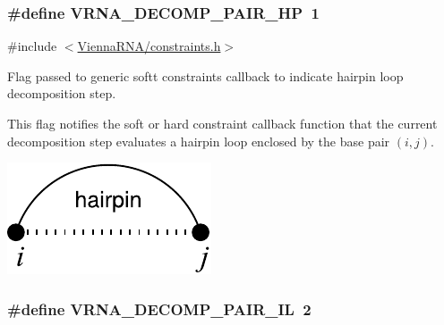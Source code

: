 \subsubsection[{\texorpdfstring{V\+R\+N\+A\+\_\+\+D\+E\+C\+O\+M\+P\+\_\+\+P\+A\+I\+R\+\_\+\+HP}{VRNA_DECOMP_PAIR_HP}}]{\setlength{\rightskip}{0pt plus 5cm}\#define V\+R\+N\+A\+\_\+\+D\+E\+C\+O\+M\+P\+\_\+\+P\+A\+I\+R\+\_\+\+HP~1}\hypertarget{group__constraints_ga8bd41ebc8039378d242e4e8c273716a5}{}\label{group__constraints_ga8bd41ebc8039378d242e4e8c273716a5}


{\ttfamily \#include $<$\hyperlink{constraints_8h}{Vienna\+R\+N\+A/constraints.\+h}$>$}



Flag passed to generic softt constraints callback to indicate hairpin loop decomposition step. 

This flag notifies the soft or hard constraint callback function that the current decomposition step evaluates a hairpin loop enclosed by the base pair $(i,j)$.

 
\begin{DoxyImageNoCaption}
  \mbox{\includegraphics[width=\textwidth,height=\textheight/2,keepaspectratio=true]{decomp_hp}}
\end{DoxyImageNoCaption}
\subsubsection[{\texorpdfstring{V\+R\+N\+A\+\_\+\+D\+E\+C\+O\+M\+P\+\_\+\+P\+A\+I\+R\+\_\+\+IL}{VRNA_DECOMP_PAIR_IL}}]{\setlength{\rightskip}{0pt plus 5cm}\#define V\+R\+N\+A\+\_\+\+D\+E\+C\+O\+M\+P\+\_\+\+P\+A\+I\+R\+\_\+\+IL~2}\hypertarget{group__constraints_gaeab04f34d7730cff2d651d782f95d857}{}\label{group__constraints_gaeab04f34d7730cff2d651d782f95d857}


